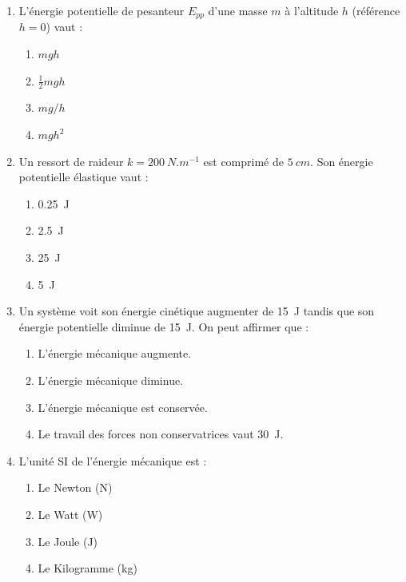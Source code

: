 \documentclass[11pt]{article}
\begin{document}
\begin{exercice}
\begin{enumerate}
    \item L'énergie potentielle de pesanteur $E_{pp}$ d'une masse $m$ à l'altitude $h$ (référence $h=0$) vaut :
    \begin{enumerate}
        \item $mgh$ \item $\frac{1}{2}mgh$ \item $mg/h$ \item $mgh^2$
    \end{enumerate}
    \item Un ressort de raideur $k = \SI{200}{N.m^{-1}}$ est comprimé de $\SI{5}{cm}$. Son énergie potentielle élastique vaut :
    \begin{enumerate}
        \item \SI{0,25}{J} \item \SI{2,5}{J} \item \SI{25}{J} \item \SI{5}{J}
    \end{enumerate}
    \item Un système voit son énergie cinétique augmenter de \SI{15}{J} tandis que son énergie potentielle diminue de \SI{15}{J}. On peut affirmer que :
    \begin{enumerate}
        \item L'énergie mécanique augmente. \item L'énergie mécanique diminue.
        \item L'énergie mécanique est conservée. \item Le travail des forces non conservatrices vaut \SI{30}{J}.
    \end{enumerate}
    \item L'unité SI de l'énergie mécanique est :
    \begin{enumerate}
        \item Le Newton (N) \item Le Watt (W) \item Le Joule (J) \item Le Kilogramme (kg)
    \end{enumerate}
\end{enumerate}
\end{exercice}
\end{document}
